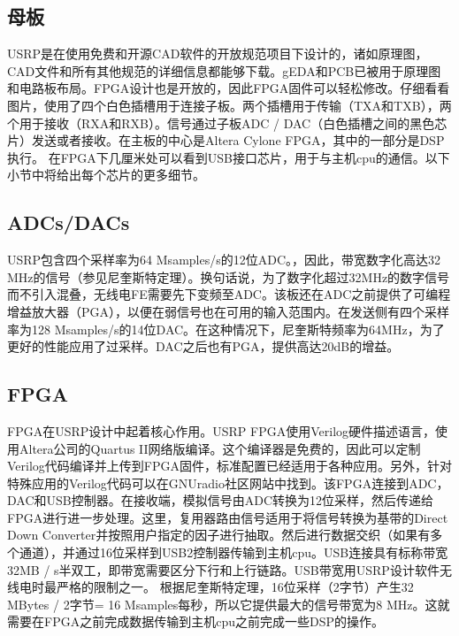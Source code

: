 \subsection{母板}
\par USRP是在使用免费和开源CAD软件的开放规范项目下设计的，诸如原理图，CAD文件和所有其他规范的详细信息都能够下载。gEDA和PCB已被用于原理图和电路板布局。FPGA设计也是开放的，因此FPGA固件可以轻松修改。仔细看看图片，使用了四个白色插槽用于连接子板。两个插槽用于传输（TXA和TXB），两个用于接收（RXA和RXB）。信号通过子板ADC / DAC（白色插槽之间的黑色芯片）发送或者接收。在主板的中心是Altera Cylone FPGA，其中的一部分是DSP执行。 在FPGA下几厘米处可以看到USB接口芯片，用于与主机cpu的通信。以下小节中将给出每个芯片的更多细节。
\subsection{ADCs/DACs}
\par USRP包含四个采样率为64 Msamples/s的12位ADC。，因此，带宽数字化高达32 MHz的信号（参见尼奎斯特定理）。换句话说，为了数字化超过32MHz的数字信号而不引入混叠，无线电FE需要先下变频至ADC。该板还在ADC之前提供了可编程增益放大器（PGA），以便在弱信号也在可用的输入范围内。在发送侧有四个采样率为128 Msamples/s的14位DAC。在这种情况下，尼奎斯特频率为64MHz，为了更好的性能应用了过采样。DAC之后也有PGA，提供高达20dB的增益。
\subsection{FPGA}
\par FPGA在USRP设计中起着核心作用。USRP FPGA使用Verilog硬件描述语言，使用Altera公司的Quartus II网络版编译。这个编译器是免费的，因此可以定制Verilog代码编译并上传到FPGA固件，标准配置已经适用于各种应用。另外，针对特殊应用的Verilog代码可以在GNUradio社区网站中找到。该FPGA连接到ADC，DAC和USB控制器。在接收端，模拟信号由ADC转换为12位采样，然后传递给FPGA进行进一步处理。这里，复用器路由信号适用于将信号转换为基带的Direct Down Converter并按照用户指定的因子进行抽取。然后进行数据交织（如果有多个通道），并通过16位采样到USB2控制器传输到主机cpu。USB连接具有标称带宽32MB / s半双工，即带宽需要区分下行和上行链路。USB带宽用USRP设计软件无线电时最严格的限制之一。 根据尼奎斯特定理，16位采样（2字节）产生32 MBytes / 2字节= 16 Msamples每秒，所以它提供最大的信号带宽为8 MHz。这就需要在FPGA之前完成数据传输到主机cpu之前完成一些DSP的操作。